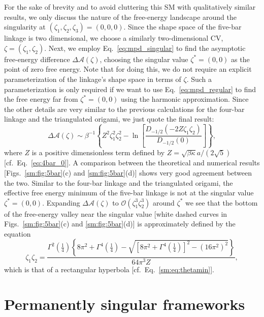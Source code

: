 For the sake of brevity and to avoid cluttering this SM with qualitatively similar results, we only discuss the nature of the free-energy landscape around the singularity at $(\zeta_{1}, \zeta_{2}, \zeta_{3}) = (0, 0, 0)$.
Since the shape space of the five-bar linkage is two dimensional, we choose a similarly two-dimensional CV, $\zeta = (\zeta_{1}, \zeta_{2})$.
Next, we employ Eq.~\eqref{eq:mpd_singular} to find the asymptotic free-energy difference $\Delta \mathscr{A}(\zeta)$, choosing the singular value $\zeta^{*} = (0,0)$ as the point of zero free energy.
Note that for doing this, we do not require an explicit parameterization of the linkage's shape space in terms of $\zeta$.  Such a parameterization is only required if we want to use Eq.~\eqref{eq:mpd_regular} to find the free energy far from $\zeta^{*} = (0, 0)$ using the harmonic approximation.
Since the other details are very similar to the previous calculations for the four-bar linkage and the triangulated origami, we just quote the final result:
%
\begin{equation}
  \Delta\mathscr{A}(\zeta) \sim \beta^{-1}\left\{Z^{2}\zeta_{1}^{2}\zeta_{2}^{2} - \ln\left[\frac{D_{-1/2}(-2Z\zeta_{1}\zeta_{2})}{D_{-1/2}(0)}\right]\right\},\label{sm:eq:5bar}
\end{equation}
%
where $Z$ is a positive dimensionless term defined by $Z = \sqrt{\beta\kappa}a/(2\sqrt{5})$ [cf.~Eq.~\eqref{eq:4bar_0}].
A comparison between the theoretical and numerical results [Figs.~\ref{sm:fig:5bar}(c) and \ref{sm:fig:5bar}(d)] shows very good agreement between the two.
Similar to the four-bar linkage and the triangulated origami, the effective free energy minimum of the five-bar linkage is not at the singular value $\zeta^{*} = (0, 0)$.
Expanding $\Delta\mathscr{A}(\zeta)$ to $\mathscr{O}(\zeta_{1}^{3}\zeta_{2}^{3})$ around $\zeta^{*}$ we see that the bottom of the free-energy valley near the singular value [white dashed curves in Figs.~\ref{sm:fig:5bar}(c) and \ref{sm:fig:5bar}(d)] is approximately defined by the equation
%
\begin{equation}
  \zeta_{1}\zeta_{2} = \frac{\Gamma^{2}\left(\frac{1}{4}\right)\left\{8\pi^{2} + \Gamma^{4}\left(\frac{1}{4}\right) - \sqrt{\left[8\pi^{2} + \Gamma^{4}\left(\frac{1}{4}\right)\right]^{2} - (16\pi^{2})^{2}}\right\}}{64\pi^{3}Z},
  \label{sm:eq:5barvalley}
\end{equation}
%
which is that of a rectangular hyperbola [cf.~Eq.~\eqref{sm:eq:thetamin}].

\section{Permanently singular frameworks}
\label{sm:sec:permanent}


